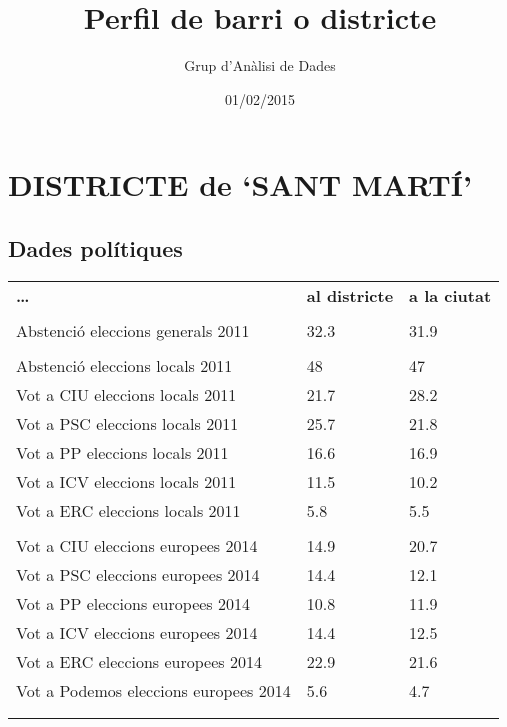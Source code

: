 \documentclass[]{article}
\title{Perfil de barri o districte}
\author{Grup d'Anàlisi de Dades}
\date{01/02/2015}
\begin{document}
\maketitle


\section{DISTRICTE de `SANT MARTÍ'}\label{districte-de-sant-marti}

\subsection{Dades polítiques}\label{dades-politiques}

\begin{longtable}[c]{@{}lll@{}}
\toprule\addlinespace
\textbf{\ldots{}} & \textbf{al districte} & \textbf{a la ciutat}
\\\addlinespace
\midrule\endhead
\\\addlinespace
Abstenció eleccions generals 2011 & 32.3 & 31.9
\\\addlinespace
\\\addlinespace
Abstenció eleccions locals 2011 & 48 & 47
\\\addlinespace
Vot a CIU eleccions locals 2011 & 21.7 & 28.2
\\\addlinespace
Vot a PSC eleccions locals 2011 & 25.7 & 21.8
\\\addlinespace
Vot a PP eleccions locals 2011 & 16.6 & 16.9
\\\addlinespace
Vot a ICV eleccions locals 2011 & 11.5 & 10.2
\\\addlinespace
Vot a ERC eleccions locals 2011 & 5.8 & 5.5
\\\addlinespace
\\\addlinespace
Vot a CIU eleccions europees 2014 & 14.9 & 20.7
\\\addlinespace
Vot a PSC eleccions europees 2014 & 14.4 & 12.1
\\\addlinespace
Vot a PP eleccions europees 2014 & 10.8 & 11.9
\\\addlinespace
Vot a ICV eleccions europees 2014 & 14.4 & 12.5
\\\addlinespace
Vot a ERC eleccions europees 2014 & 22.9 & 21.6
\\\addlinespace
Vot a Podemos eleccions europees 2014 & 5.6 & 4.7
\\\addlinespace
\\\addlinespace
\bottomrule
\end{longtable}
\end{document}
